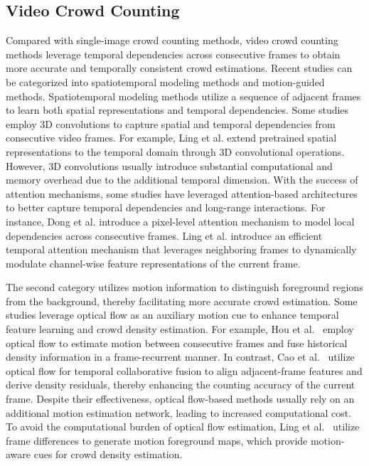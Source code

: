 \documentclass[lettersize,journal]{IEEEtran}
\begin{document}
\subsection{Video Crowd Counting}
Compared with single-image crowd counting methods, video crowd counting methods leverage temporal dependencies across consecutive frames to obtain more accurate and temporally consistent crowd estimations. Recent studies can be categorized into spatiotemporal modeling methods and motion-guided methods. Spatiotemporal modeling methods\cite{xiong2017spatiotemporal,zou2019enhanced,ma2021spatiotemporal,wu2022spatial,cai2022global,dong2022clrnet,ling2025dual,ling2026dual,ling2026cascaded} utilize a sequence of adjacent frames to learn both spatial representations and temporal dependencies. Some studies \cite{zou2019enhanced,ma2021spatiotemporal,ling2026dual} employ 3D convolutions\cite{tran2015learning} to capture spatial and temporal dependencies from consecutive video frames. For example, Ling et al.\cite{ling2026dual} extend pretrained spatial representations to the temporal domain through 3D convolutional operations. However, 3D convolutions usually introduce substantial computational and memory overhead due to the additional temporal dimension. With the success of attention mechanisms\cite{vaswani2017attention}, some studies\cite{wu2022spatial,dong2022clrnet,ling2026cascaded} have leveraged attention-based architectures to better capture temporal dependencies and long-range interactions. For instance, Dong et al.\cite{dong2022clrnet} introduce a pixel-level attention mechanism to model local dependencies across consecutive frames. Ling et al.\cite{ling2026cascaded} introduce an efficient temporal attention mechanism that leverages neighboring frames to dynamically modulate channel-wise feature representations of the current frame.

The second category utilizes motion information to distinguish foreground regions from the background, thereby facilitating more accurate crowd estimation. Some studies\cite{ranjan2017optical,hossain2020video,hou2023frame,cao2024efficient} leverage optical flow as an auxiliary motion cue to enhance temporal feature learning and crowd density estimation. For example, Hou et al.~\cite{hou2023frame} employ optical flow to estimate motion between consecutive frames and fuse historical density information in a frame-recurrent manner. In contrast, Cao et al.~\cite{cao2024efficient} utilize optical flow for temporal collaborative fusion to align adjacent-frame features and derive density residuals, thereby enhancing the counting accuracy of the current frame. Despite their effectiveness, optical flow-based methods usually rely on an additional motion estimation network, leading to increased computational cost. To avoid the computational burden of optical flow estimation, Ling et al.~\cite{ling2023motional} utilize frame differences to generate motion foreground maps, which provide motion-aware cues for crowd density estimation. 
\end{document}
